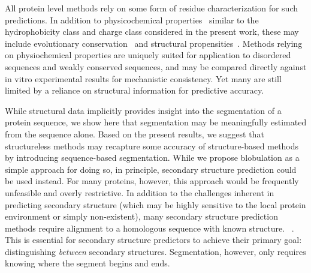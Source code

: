 \documentclass[10pt,letterpaper]{article}
\newcommand{\hydrochar}{hydrophobicity class}
\newcommand{\chargechar}{charge class}
\begin{document}
All protein level methods rely on some form of residue characterization for such predictions. In addition to physicochemical properties~\cite{Stone2005, Niroula2015, LopezFerrando2017,Hecht2015,Popov2019} similar to the \hydrochar{} and \chargechar{} considered in the present work, these may include evolutionary conservation~\cite{Stone2005, Thomas2004, Ng2001, Choi2012, Hecht2015, Niroula2015,Thomas2004,Capriotti2006} and structural propensities~\cite{Iqbal2019, Ittisoponpisan2019, Capriotti2004,Capriotti2005, Parthiban2006, Wainreb2010,Popov2019}. Methods relying on physiochemical properties are uniquely suited for application to disordered sequences and weakly conserved sequences, and may be compared directly against in vitro experimental results for mechanistic consistency. Yet many are still limited by a reliance on structural information for predictive accuracy.  

While structural data implicitly provides insight into the segmentation of a protein sequence, we show here that segmentation may be meaningfully estimated from the sequence alone. Based on the present results, we suggest that structureless methods may recapture some accuracy of structure-based methods by introducing sequence-based segmentation.  While we propose blobulation as a simple approach for doing so, in principle, secondary structure prediction could be used instead. For many proteins, however, this approach would be frequently unfeasible and overly restrictive. In addition to the challenges inherent in predicting secondary structure (which may be highly sensitive to the local protein environment or simply non-existent), many secondary structure prediction methods require alignment to a homologous sequence with known structure. ~\cite{Yang2018, Zhang2018a,Wang2017,Aydin,Ma2018}. This is essential for secondary structure predictors to achieve their primary goal: distinguishing \textit{between} secondary structures. Segmentation, however, only requires knowing where the segment begins and ends.  
\end{document}
